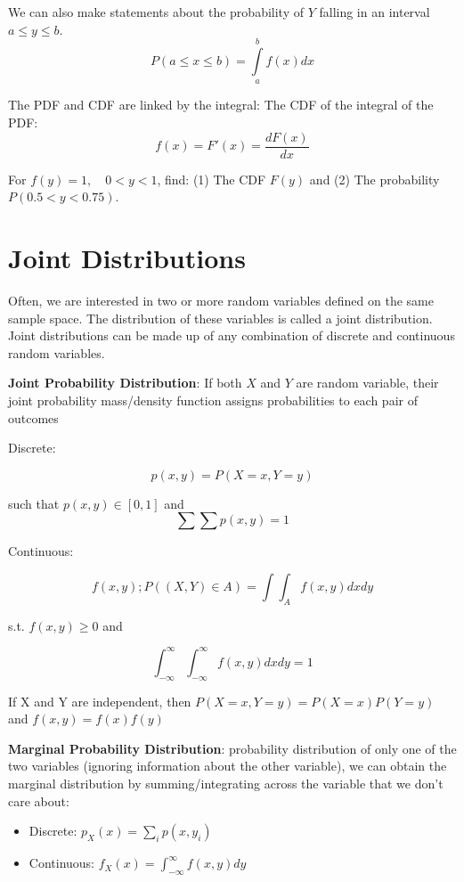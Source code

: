 \documentclass[]{book}
\providecommand{\tightlist}{%
  \setlength{\itemsep}{0pt}\setlength{\parskip}{0pt}}
\theoremstyle{definition}
\theoremstyle{definition}
\theoremstyle{definition}
\theoremstyle{remark}
\let\BeginKnitrBlock\begin \let\EndKnitrBlock\end
\begin{document}
We can also make statements about the probability of \(Y\) falling in an
interval \(a\le y\le b\). \[P(a\le x\le b)=\int\limits_a^b f(x)dx\]

The PDF and CDF are linked by the integral: The CDF of the integral of
the PDF: \[f(x) = F'(x)=\frac{dF(x)}{dx}\]

\BeginKnitrBlock{example}
\protect\hypertarget{exm:unnamed-chunk-81}{}{\label{exm:unnamed-chunk-81} }
For \(f(y)=1, \quad 0<y<1\), find: (1) The CDF \(F(y)\) and (2) The
probability \(P(0.5<y<0.75)\).
\EndKnitrBlock{example}

\section{Joint Distributions}\label{joint-distributions}

Often, we are interested in two or more random variables defined on the
same sample space. The distribution of these variables is called a joint
distribution. Joint distributions can be made up of any combination of
discrete and continuous random variables.

\textbf{Joint Probability Distribution}: If both \(X\) and \(Y\) are
random variable, their joint probability mass/density function assigns
probabilities to each pair of outcomes

Discrete:

\[p(x, y) = P(X = x, Y = y)\]

such that \(p(x,y) \in [0,1]\) and \[\sum\sum p(x,y) = 1\]

Continuous:

\[f(x,y);P((X,Y) \in A) = \int\!\!\!\int_A f(x,y)dx dy \]

s.t. \(f(x,y)\ge 0\) and

\[\int_{-\infty}^\infty\int_{-\infty}^\infty f(x,y)dxdy = 1\]

If X and Y are independent, then \(P(X=x,Y=y) = P(X=x)P(Y=y)\) and
\(f(x,y) = f(x)f(y)\)

\textbf{Marginal Probability Distribution}: probability distribution of
only one of the two variables (ignoring information about the other
variable), we can obtain the marginal distribution by
summing/integrating across the variable that we don't care about:

\begin{itemize}
\tightlist
\item
  Discrete: \(p_X(x) = \sum_i p(x, y_i)\)
\item
  Continuous: \(f_X(x) = \int_{-\infty}^\infty f(x,y)dy\)
\end{itemize}
\end{document}
